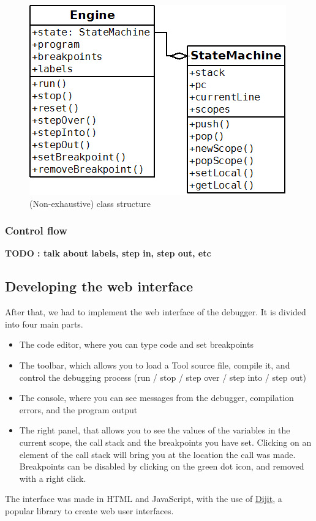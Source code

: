 \begin{figure}[h]
  \centering
    \includegraphics[scale=0.6]{diag.png}
     \caption{(Non-exhaustive) class structure}
\end{figure}

\subsubsection{Control flow}

\textbf{TODO : talk about labels, step in, step out, etc}

\subsection{Developing the web interface}

After that, we had to implement the web interface of the debugger. It is divided into four main parts.

\begin{itemize}
\item The code editor, where you can type code and set breakpoints
\item The toolbar, which allows you to load a Tool source file, compile it, and control the debugging process (run / stop / step over / step into / step out)
\item The console, where you can see messages from the debugger, compilation errors, and the program output
\item The right panel, that allows you to see the values of the variables in the current scope, the call stack and the breakpoints you have set. Clicking on an element of the call stack will bring you at the location the call was made. Breakpoints can be disabled by clicking on the green dot icon, and removed with a right click.
\end{itemize}

The interface was made in HTML and JavaScript, with the use of \href{http://dojotoolkit.org/reference-guide/1.10/dijit/}{Dijit}, a popular library to create web user interfaces.
